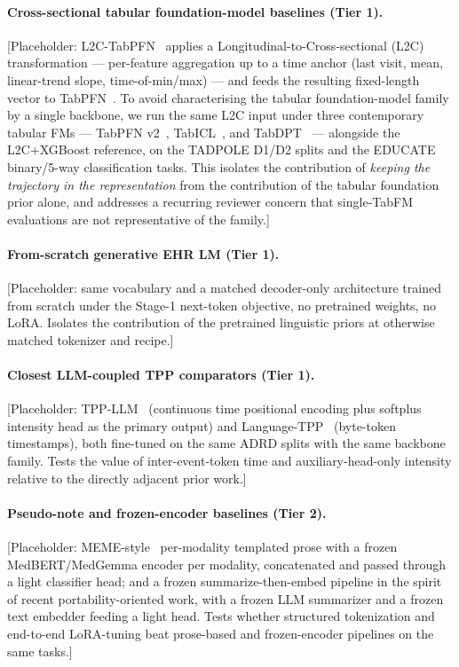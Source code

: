 \documentclass{article}
\begin{document}
\paragraph{Cross-sectional tabular foundation-model baselines (Tier 1).}
[Placeholder: L2C-TabPFN~\citep{l2ctabpfn2025} applies a Longitudinal-to-Cross-sectional (L2C) transformation — per-feature aggregation up to a time anchor (last visit, mean, linear-trend slope, time-of-min/max) — and feeds the resulting fixed-length vector to TabPFN~\citep{hollmann2025tabpfn}. To avoid characterising the tabular foundation-model family by a single backbone, we run the same L2C input under three contemporary tabular FMs — TabPFN v2~\citep{hollmann2025tabpfn}, TabICL~\citep{qu2025tabicl}, and TabDPT~\citep{ma2024tabdpt} — alongside the L2C+XGBoost reference, on the TADPOLE D1/D2 splits and the EDUCATE binary/5-way classification tasks. This isolates the contribution of \emph{keeping the trajectory in the representation} from the contribution of the tabular foundation prior alone, and addresses a recurring reviewer concern that single-TabFM evaluations are not representative of the family.]

\paragraph{From-scratch generative EHR LM (Tier 1).}
[Placeholder: same vocabulary and a matched decoder-only architecture trained from scratch under the Stage-1 next-token objective, no pretrained weights, no LoRA. Isolates the contribution of the pretrained linguistic priors at otherwise matched tokenizer and recipe.]

\paragraph{Closest LLM-coupled TPP comparators (Tier 1).}
[Placeholder: TPP-LLM~\citep{liu2025tpp} (continuous time positional encoding plus softplus intensity head as the primary output) and Language-TPP~\citep{kong2025language} (byte-token timestamps), both fine-tuned on the same ADRD splits with the same backbone family. Tests the value of inter-event-token time and auxiliary-head-only intensity relative to the directly adjacent prior work.]

\paragraph{Pseudo-note and frozen-encoder baselines (Tier 2).}
[Placeholder: MEME-style~\citep{lee2025clinical} per-modality templated prose with a frozen MedBERT/MedGemma encoder per modality, concatenated and passed through a light classifier head; and a frozen summarize-then-embed pipeline in the spirit of recent portability-oriented work, with a frozen LLM summarizer and a frozen text embedder feeding a light head. Tests whether structured tokenization and end-to-end LoRA-tuning beat prose-based and frozen-encoder pipelines on the same tasks.]
\end{document}
